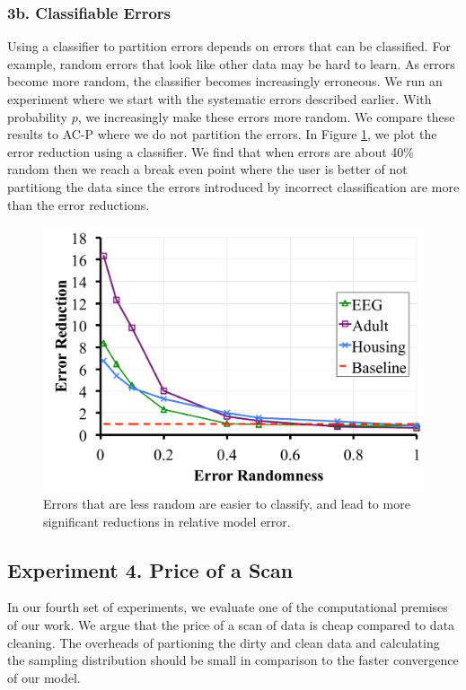\subsubsection{3b. Classifiable Errors}
Using a classifier to partition errors depends on errors that can be classified.
For example, random errors that look like other data may be hard to learn.
As errors become more random, the classifier becomes increasingly erroneous.
We run an experiment where we start with the systematic errors described earlier.
With probability $p$, we increasingly make these errors more random.
We compare these results to AC-P where we do not partition the errors.
In Figure \ref{tradeoffs2}, we plot the error reduction using a classifier.
We find that when errors are about 40\% random then we reach a break even point
where the user is better of not partitiong the data since the errors introduced by incorrect classification are more than the error reductions.

\begin{figure}[ht!]
\centering
 \includegraphics[scale=0.13]{exp/exp5a.pdf}
 \caption{Errors that are less random are easier to classify, and lead to more significant reductions in relative model error. \label{tradeoffs2}}
\end{figure}

\subsection{Experiment 4. Price of a Scan}
In our fourth set of experiments, we evaluate one of the computational premises of our work.
We argue that the price of a scan of data is cheap compared to data cleaning.
The overheads of partioning the dirty and clean data and calculating the sampling distribution should be small in comparison to the faster convergence of our model.

